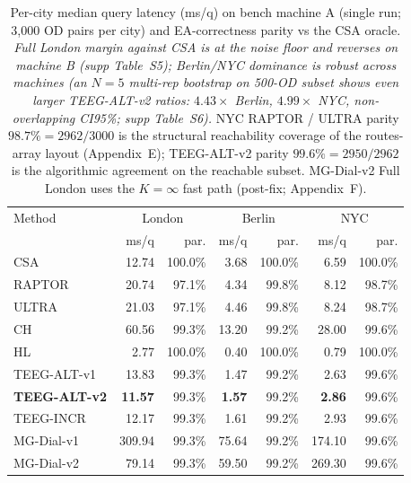 \documentclass[letterpaper]{article}
\theoremstyle{definition}
\theoremstyle{plain}
\begin{document}
\begin{table}[t]
\centering
\caption{Per-city median query latency (ms/q) on bench machine A
(single run; 3{,}000 OD pairs per city) and EA-correctness parity
vs the CSA oracle. \emph{Full London margin against CSA is at the
noise floor and reverses on machine B (supp Table~S5); Berlin/NYC
dominance is robust across machines (an $N\!=\!5$ multi-rep
bootstrap on 500-OD subset shows even larger TEEG-ALT-v2 ratios:
$4.43\times$ Berlin, $4.99\times$ NYC, non-overlapping CI95\%; supp
Table~S6).} NYC RAPTOR / ULTRA parity $98.7\%\!=\!2962/3000$ is the
structural reachability coverage of the routes-array layout
(Appendix~E); TEEG-ALT-v2 parity $99.6\%\!=\!2950/2962$ is the
algorithmic agreement on the reachable subset. MG-Dial-v2 Full
London uses the $K\!=\!\infty$ fast path (post-fix; Appendix~F).}
\label{tab:per-city}
\small
\begin{tabular}{lrrrrrr}
\toprule
Method & \multicolumn{2}{c}{London} & \multicolumn{2}{c}{Berlin} & \multicolumn{2}{c}{NYC} \\
       & ms/q & par. & ms/q & par. & ms/q & par. \\
\midrule
CSA            & 12.74 & 100.0\% & 3.68 & 100.0\% & 6.59 & 100.0\% \\
RAPTOR         & 20.74 & 97.1\%  & 4.34 & 99.8\%  & 8.12 & 98.7\% \\
ULTRA          & 21.03 & 97.1\%  & 4.46 & 99.8\%  & 8.24 & 98.7\% \\
CH             & 60.56 & 99.3\%  & 13.20 & 99.2\% & 28.00 & 99.6\% \\
HL             & 2.77  & 100.0\% & 0.40 & 100.0\% & 0.79  & 100.0\% \\
TEEG-ALT-v1    & 13.83 & 99.3\%  & 1.47 & 99.2\%  & 2.63  & 99.6\% \\
\textbf{TEEG-ALT-v2}   & \textbf{11.57} & 99.3\% & \textbf{1.57} & 99.2\% & \textbf{2.86} & 99.6\% \\
TEEG-INCR      & 12.17 & 99.3\%  & 1.61 & 99.2\%  & 2.93  & 99.6\% \\
MG-Dial-v1     & 309.94 & 99.3\% & 75.64 & 99.2\% & 174.10 & 99.6\% \\
MG-Dial-v2     &  79.14 & 99.3\% & 59.50 & 99.2\% & 269.30 & 99.6\% \\
\bottomrule
\end{tabular}
\end{table}
\end{document}
